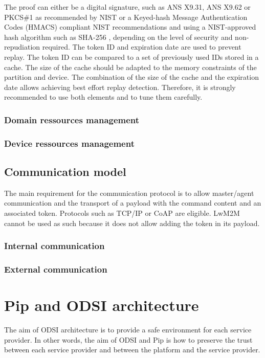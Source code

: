 \documentclass[conference]{IEEEtran}
\begin{document}
The proof can either be a digital signature, such as ANS X9.31, ANS X9.62 or PKCS\#1 as recommended by NIST \cite{nist_dss_2013} or a Keyed-hash Message Authentication Codes (HMACS) compliant NIST recommendations and using a NIST-approved hash algorithm such as SHA-256 \cite{nist_hmac_2008, nist_hash_2012}, depending on the level of security and non-repudiation required.
The token ID and expiration date are used to prevent replay. The token ID can be compared to a set of previously used IDs stored in a cache. The size of the cache should be adapted to the memory constraints of the partition and device. The combination of the size of the cache and the expiration date allows achieving best effort replay detection. Therefore, it is strongly recommended to use both elements and to tune them carefully. 

\subsubsection{Domain ressources management}
\subsubsection{Device ressources management}

\subsection{Communication model}
\label{sec:Communication_model}
The main requirement for the communication protocol is to allow master/agent communication and the transport of a payload with the command content and an associated token. Protocols such as TCP/IP or CoAP are eligible. LwM2M \cite{oma_lwm2M_2017} cannot be used as such because it does not allow adding the token in its payload.

\subsubsection{Internal communication}



\subsubsection{External communication}


\section{Pip and ODSI architecture}
The aim of ODSI architecture is to provide a safe environment for each service provider. In other words, the aim of ODSI and Pip is how to preserve the trust between each service provider and between the platform and the service provider.  
\end{document}
